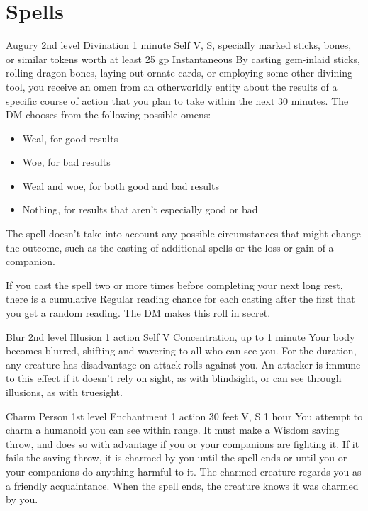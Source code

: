 \documentclass[10pt,a4paper,twoside,bg=print,twocolumn,openany,nodeprecatedcode]{dndbook}
\begin{document}
\chapter{Spells}


\DndSpellHeader%
{Augury}
{2nd level Divination}
{1 minute}
{Self}
{V, S, specially marked sticks, bones, or similar tokens worth at least 25 gp}
{Instantaneous}
By casting gem-inlaid sticks, rolling dragon bones, laying out ornate cards, or employing some other divining tool, you receive an omen from an otherworldly entity about the results of a specific course of action that you plan to take within the next 30 minutes. The DM chooses from the following possible omens:


\begin{itemize}
\item Weal, for good results
\item Woe, for bad results
\item Weal and woe, for both good and bad results
\item Nothing, for results that aren't especially good or bad
\end{itemize}

The spell doesn't take into account any possible circumstances that might change the outcome, such as the casting of additional spells or the loss or gain of a companion.

If you cast the spell two or more times before completing your next long rest, there is a cumulative Regular reading chance for each casting after the first that you get a random reading. The DM makes this roll in secret.



\DndSpellHeader%
{Blur}
{2nd level Illusion}
{1 action}
{Self}
{V}
{Concentration, up to 1 minute}
Your body becomes blurred, shifting and wavering to all who can see you. For the duration, any creature has disadvantage on attack rolls against you. An attacker is immune to this effect if it doesn't rely on sight, as with blindsight, or can see through illusions, as with truesight.



\DndSpellHeader%
{Charm Person}
{1st level Enchantment}
{1 action}
{30 feet}
{V, S}
{1 hour}
You attempt to charm a humanoid you can see within range. It must make a Wisdom saving throw, and does so with advantage if you or your companions are fighting it. If it fails the saving throw, it is charmed by you until the spell ends or until you or your companions do anything harmful to it. The charmed creature regards you as a friendly acquaintance. When the spell ends, the creature knows it was charmed by you.
\end{document}
